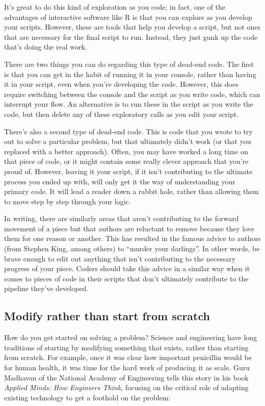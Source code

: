 \documentclass[]{tufte-book}
\begin{document}
It's great to do this kind of exploration as you code; in fact, one of the
advantages of interactive software like R is that you can explore as you
develop your scripts. However, these are tools that help you develop a script,
but not ones that are necessary for the final script to run. Instead, they just
gunk up the code that's doing the real work.

There are two things you can do regarding this type of dead-end code. The first
is that you can get in the habit of running it in your console, rather than
having it in your script, even when you're developing the code. However, this
does require switching between the console and the script as you write code,
which can interrupt your flow. An alternative is to run these in the script as
you write the code, but then delete any of these exploratory calls as you
edit your script.

There's also a second type of dead-end code. This is code that you wrote to try
out to solve a particular problem, but that ultimately didn't work (or that
you replaced with a better approach). Often, you may have worked a long time
on that piece of code, or it might contain some really clever approach that
you're proud of. However, leaving it your script, if it isn't contributing to
the ultimate process you ended up with, will only get it the way of understanding
your primary code. It will lead a reader down a rabbit hole, rather than allowing
them to move step by step through your logic.

In writing, there are similarly areas that aren't contributing to the forward
movement of a piece but that authors are reluctant to remove because they love
them for one reason or another. This has resulted in the famous advice to
authors (from Stephen King, among others) to ``murder your darlings''. In other
words, be brave enough to edit out anything that isn't contributing to the
necessary progress of your piece. Coders should take this advice in a similar
way when it comes to pieces of code in their scripts that don't ultimately
contribute to the pipeline they've developed.

\subsection{Modify rather than start from scratch}\label{modify-rather-than-start-from-scratch}

How do you get started on solving a problem? Science and engineering have long
traditions of starting by modifying something that exists, rather than starting
from scratch. For example, once it was clear how important penicillin would be
for human health, it was time for the hard work of producing it as scale. Guru
Madhavan of the National Academy of Engineering tells this story in his book
\emph{Applied Minds: How Engineers Think}, focusing on the critical role of adapting
existing technology to get a foothold on the problem:
\end{document}
